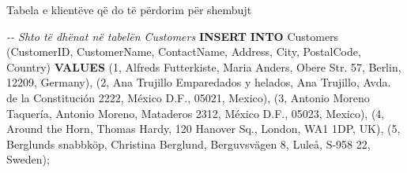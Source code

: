 \documentclass[
  ignorenonframetext,
]{beamer}
\newenvironment{Shaded}{\begin{snugshade}}{\end{snugshade}}
\newcommand{\CommentTok}[1]{\textcolor[rgb]{0.56,0.35,0.01}{\textit{#1}}}
\newcommand{\DecValTok}[1]{\textcolor[rgb]{0.00,0.00,0.81}{#1}}
\newcommand{\KeywordTok}[1]{\textcolor[rgb]{0.13,0.29,0.53}{\textbf{#1}}}
\newcommand{\NormalTok}[1]{#1}
\newcommand{\StringTok}[1]{\textcolor[rgb]{0.31,0.60,0.02}{#1}}
\begin{document}
\begin{frame}[fragile]{Tabela e klientëve që do të përdorim për
shembujt}
\label{tabela-e-klientuxebve-quxeb-do-tuxeb-puxebrdorim-puxebr-shembujt-1}

\begin{Shaded}
\begin{Highlighting}[]
\CommentTok{{-}{-} Shto të dhënat në tabelën Customers}
\KeywordTok{INSERT} \KeywordTok{INTO}\NormalTok{ Customers (CustomerID, CustomerName, ContactName, Address, City, PostalCode, Country) }\KeywordTok{VALUES}
\NormalTok{(}\DecValTok{1}\NormalTok{, }\StringTok{\textquotesingle{}Alfreds Futterkiste\textquotesingle{}}\NormalTok{, }\StringTok{\textquotesingle{}Maria Anders\textquotesingle{}}\NormalTok{, }\StringTok{\textquotesingle{}Obere Str. 57\textquotesingle{}}\NormalTok{, }\StringTok{\textquotesingle{}Berlin\textquotesingle{}}\NormalTok{, }\StringTok{\textquotesingle{}12209\textquotesingle{}}\NormalTok{, }\StringTok{\textquotesingle{}Germany\textquotesingle{}}\NormalTok{),}
\NormalTok{(}\DecValTok{2}\NormalTok{, }\StringTok{\textquotesingle{}Ana Trujillo Emparedados y helados\textquotesingle{}}\NormalTok{, }\StringTok{\textquotesingle{}Ana Trujillo\textquotesingle{}}\NormalTok{, }\StringTok{\textquotesingle{}Avda. de la Constitución 2222\textquotesingle{}}\NormalTok{, }\StringTok{\textquotesingle{}México D.F.\textquotesingle{}}\NormalTok{, }\StringTok{\textquotesingle{}05021\textquotesingle{}}\NormalTok{, }\StringTok{\textquotesingle{}Mexico\textquotesingle{}}\NormalTok{),}
\NormalTok{(}\DecValTok{3}\NormalTok{, }\StringTok{\textquotesingle{}Antonio Moreno Taquería\textquotesingle{}}\NormalTok{, }\StringTok{\textquotesingle{}Antonio Moreno\textquotesingle{}}\NormalTok{, }\StringTok{\textquotesingle{}Mataderos 2312\textquotesingle{}}\NormalTok{, }\StringTok{\textquotesingle{}México D.F.\textquotesingle{}}\NormalTok{, }\StringTok{\textquotesingle{}05023\textquotesingle{}}\NormalTok{, }\StringTok{\textquotesingle{}Mexico\textquotesingle{}}\NormalTok{),}
\NormalTok{(}\DecValTok{4}\NormalTok{, }\StringTok{\textquotesingle{}Around the Horn\textquotesingle{}}\NormalTok{, }\StringTok{\textquotesingle{}Thomas Hardy\textquotesingle{}}\NormalTok{, }\StringTok{\textquotesingle{}120 Hanover Sq.\textquotesingle{}}\NormalTok{, }\StringTok{\textquotesingle{}London\textquotesingle{}}\NormalTok{, }\StringTok{\textquotesingle{}WA1 1DP\textquotesingle{}}\NormalTok{, }\StringTok{\textquotesingle{}UK\textquotesingle{}}\NormalTok{),}
\NormalTok{(}\DecValTok{5}\NormalTok{, }\StringTok{\textquotesingle{}Berglunds snabbköp\textquotesingle{}}\NormalTok{, }\StringTok{\textquotesingle{}Christina Berglund\textquotesingle{}}\NormalTok{, }\StringTok{\textquotesingle{}Berguvsvägen 8\textquotesingle{}}\NormalTok{, }\StringTok{\textquotesingle{}Luleå\textquotesingle{}}\NormalTok{, }\StringTok{\textquotesingle{}S{-}958 22\textquotesingle{}}\NormalTok{, }\StringTok{\textquotesingle{}Sweden\textquotesingle{}}\NormalTok{);}
\end{Highlighting}
\end{Shaded}
\end{frame}
\end{document}
